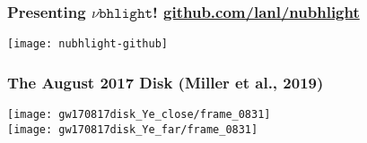 \documentclass[]{beamer}
\begin{document}
\begin{frame}
  \frametitle{Presenting $\nu\texttt{bhlight}$! \url{github.com/lanl/nubhlight}}
  \begin{center}
    \texttt{[image: nubhlight-github]}
  \end{center}
\end{frame}

\begin{frame}
  \frametitle{The August 2017 Disk (Miller et al., 2019)}
  \begin{center}
    \texttt{[image: gw170817disk\_Ye\_close/frame\_0831]} \\
    \texttt{[image: gw170817disk\_Ye\_far/frame\_0831]} 
  \end{center}
\end{frame}

\end{document}
